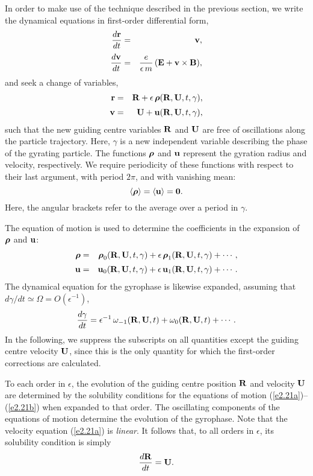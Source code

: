 In order to make use of the technique described in the previous section, we write the
dynamical equations in first-order differential form,
\begin{eqnarray}\label{e2.21a}
\frac{d{\bf r}}{dt} &=& {\bf v},\\[0.5ex]
\frac{d{\bf v}}{dt} &=& \frac{e}{\epsilon\,m} \,({\bf E} + {\bf v}\times
{\bf B}),\label{e2.21b}
\end{eqnarray}
and seek a change of variables,
\begin{eqnarray}\label{e2.22a}
{\bf r} &=& {\bf R} + \epsilon\,\mbox{\boldmath$\rho$}({\bf R}, {\bf U}, t, \gamma),
\\[0.5ex]
{\bf v} &=& {\bf U} + {\bf u} ({\bf R}, {\bf U}, t, \gamma),
\end{eqnarray}
such that the new guiding centre variables ${\bf R}$ and ${\bf U}$ are
free of oscillations along the particle trajectory. Here, $\gamma$ is a
new independent variable describing the phase of the gyrating particle. 
The functions $\mbox{\boldmath$\rho$}$ and ${\bf u}$ represent the gyration radius
and velocity, respectively. We require periodicity of these functions
with respect to their last argument, with period $2\pi$, and with vanishing mean:
\begin{equation}\label{e2.23}
\langle \mbox{\boldmath$\rho$} \rangle = \langle {\bf u} \rangle = {\bf 0}.
\end{equation}
Here, the angular brackets refer to the average over a period in $\gamma$. 

The equation of motion is used to determine the coefficients in the expansion
of $\mbox{\boldmath$\rho$}$ and ${\bf u}$:
\begin{eqnarray}
\mbox{\boldmath$\rho$} &=& \mbox{\boldmath$\rho$}_0({\bf R}, {\bf U}, t, \gamma) +
\epsilon\,\mbox{\boldmath$\rho$}_1({\bf R}, {\bf U}, t, \gamma) + \cdots, \\[0.5ex]
{\bf u} &=& {\bf u}_0({\bf R}, {\bf U}, t, \gamma) +
\epsilon\,{\bf u}_1({\bf R}, {\bf U}, t, \gamma) + \cdots.
\end{eqnarray}
The dynamical equation for the gyrophase is likewise expanded,
assuming that $d\gamma/dt \simeq {\Omega} = O(\epsilon^{-1})$, 
\begin{equation}
\frac{d\gamma}{dt} = \epsilon^{-1}\,\omega_{-1}({\bf R}, {\bf U}, t) 
+ \omega_0({\bf R}, {\bf U}, t) + \cdots.
\end{equation}
In the following, we suppress the subscripts on all quantities except
the guiding centre velocity ${\bf U}$, since this is the only quantity for
which the first-order corrections are calculated.

To each order in $\epsilon$, the evolution of the guiding centre position
${\bf R}$ and velocity ${\bf U}$
 are determined by
the solubility conditions for the equations of motion (\ref{e2.21a})--(\ref{e2.21b}) when
expanded to that order.
The oscillating components of the equations of motion determine the
evolution of the gyrophase. Note that the velocity equation
(\ref{e2.21a}) is {\em linear}. It follows that, to all orders in $\epsilon$, its solubility condition is simply
\begin{equation}
\frac{d{\bf R}}{dt} = {\bf U}.
\end{equation}


